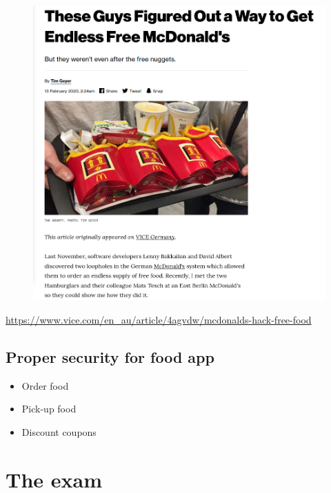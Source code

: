 \begin{frame}
  \begin{figure}
    \includegraphics[height=0.8\textheight]{McDo-heist.png}
  \end{figure}
  \url{https://www.vice.com/en_au/article/4agvdw/mcdonalds-hack-free-food}
\end{frame}

\subsection{Proper security for food app}

\begin{frame}
  \begin{exercise}
    \begin{itemize}
      \item Order food
      \item Pick-up food
      \item Discount coupons
    \end{itemize}
  \end{exercise}
\end{frame}

\section{The exam}


